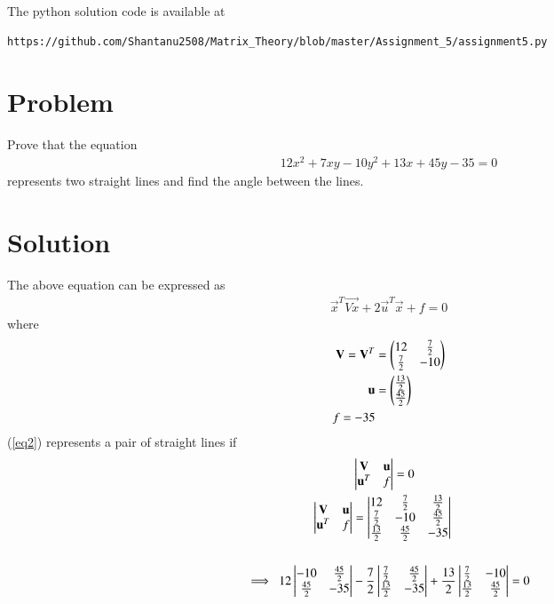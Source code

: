 \documentclass[journal,12pt,twocolumn]{IEEEtran}
\begin{document}
The python solution code is available at
\begin{lstlisting}
https://github.com/Shantanu2508/Matrix_Theory/blob/master/Assignment_5/assignment5.py
\end{lstlisting}

\section{Problem}
Prove that the equation
\begin{align*}
	12x^2 + 7xy -10y^2 +13x +45y -35 =0 
\end{align*}
represents two straight lines and find the angle between the lines.
\section{Solution}
The above equation can be expressed as
\begin{align}
        \vec{x}^{T}\vec{Vx} + 2\vec{u}^{T}\vec{x} + f=0   \label{eq2}
\end{align}
where
\begin{align}
	\mathbf{V}=\mathbf{V}^T &= \begin{pmatrix}12 & \frac{7}{2} \\ \frac{7}{2} & -10\end{pmatrix} \\
	\mathbf{u} &= \begin{pmatrix}\frac{13}{2} \\ \frac{45}{2}\end{pmatrix} \\
	 f=-35
\end{align}	
	(\ref{eq2}) represents a pair of straight lines if
\begin{align}
	&\mydet{\vec{V} & \vec{u} \\ \vec{u}^T & f} = 0     \label{eq5} \\
	\mydet{\vec{V} & \vec{u} \\ \vec{u}^T & f} 
		&= \mydet{12 & \frac{7}{2}  & \frac{13}{2} \\ 
	        \frac{7}{2} & -10 & \frac{45}{2}     \\
	       \frac{13}{2} & \frac{45}{2} & -35 }  \\
	       		\nonumber \\
	\implies \ 12\mydet{-10 & \frac{45}{2} \\ \frac{45}{2} & -35} 
		& -\frac{7}{2}\mydet{\frac{7}{2} & \frac{45}{2} \\ \frac{13}{2} & -35} 
		+\frac{13}{2}\mydet{\frac{7}{2} & -10 \\ \frac{13}{2} & \frac{45}{2}} = 0 \label{eq10}\\
\end{align}
\end{document}
